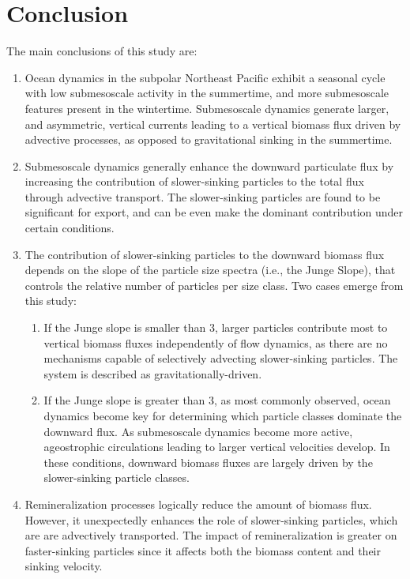 \documentclass[article,linenumbers]{agujournal2018}
\begin{document}
\section{Conclusion}
\label{sec: Conclusions}
The main conclusions of this study are: 
\begin{enumerate}
\item Ocean dynamics in the subpolar Northeast Pacific exhibit a seasonal cycle with low submesoscale activity in the summertime, and more submesoscale features present in the wintertime. Submesoscale dynamics generate larger, and asymmetric, vertical currents leading to a vertical biomass flux driven by advective processes, as opposed to gravitational sinking in the summertime.

\item Submesoscale dynamics generally enhance the downward particulate flux by increasing the contribution of slower-sinking particles to the total flux through advective transport.   The  slower-sinking particles are found to be significant for export, and can be even make the dominant contribution under certain conditions.
\item The contribution of slower-sinking particles to the downward biomass flux depends on the slope of the particle size spectra (i.e., the Junge Slope), that controls the relative number of particles per size class. Two cases emerge from this study:
\begin{enumerate}
	\item If the Junge slope is smaller than 3, larger particles contribute most to vertical biomass fluxes independently of flow dynamics, as there are no mechanisms capable of selectively advecting slower-sinking particles. The system is described as gravitationally-driven.
	\item If the Junge slope is greater than 3, as most commonly observed, ocean dynamics become key for determining which particle classes dominate the downward flux. As submesoscale dynamics become more active, ageostrophic circulations leading to larger vertical velocities develop. In these conditions, downward biomass fluxes are largely driven by the slower-sinking particle classes.
	\end{enumerate}
\item Remineralization processes logically reduce the amount of biomass flux. However, it unexpectedly enhances the role of slower-sinking particles, which are are advectively transported. The impact of remineralization is greater on faster-sinking particles since it affects both the biomass content and their sinking velocity.
\end{enumerate}
\end{document}
